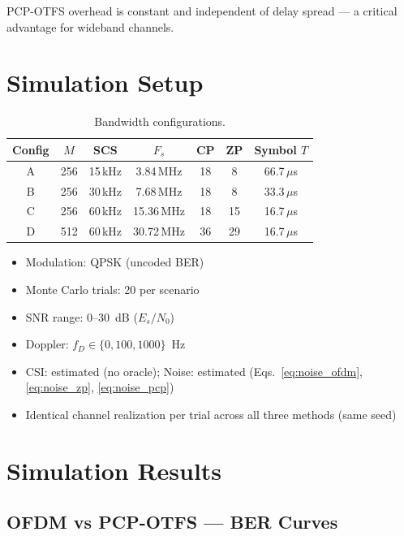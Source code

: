 \documentclass[11pt,a4paper,twoside]{article}
\begin{document}
PCP-OTFS overhead is constant and independent of delay spread --- a critical advantage for wideband channels.

\section{Simulation Setup}
\label{sec:sim}

\begin{table}[h]
\centering
\caption{Bandwidth configurations.}
\label{tab:configs}
\begin{tabular}{ccccccc}
\toprule
Config & $M$ & SCS & $F_s$ & CP & ZP & Symbol $T$ \\
\midrule
A & 256 & 15\,kHz & 3.84\,MHz & 18 & 8 & 66.7\,$\mu$s \\
B & 256 & 30\,kHz & 7.68\,MHz & 18 & 8 & 33.3\,$\mu$s \\
C & 256 & 60\,kHz & 15.36\,MHz & 18 & 15 & 16.7\,$\mu$s \\
D & 512 & 60\,kHz & 30.72\,MHz & 36 & 29 & 16.7\,$\mu$s \\
\bottomrule
\end{tabular}
\end{table}

\begin{itemize}[nosep]
    \item Modulation: QPSK (uncoded BER)
    \item Monte Carlo trials: 20 per scenario
    \item SNR range: 0--30~dB ($E_s/N_0$)
    \item Doppler: $f_D \in \{0, 100, 1000\}$~Hz
    \item CSI: estimated (no oracle); Noise: estimated (Eqs.~\ref{eq:noise_ofdm}, \ref{eq:noise_zp}, \ref{eq:noise_pcp})
    \item Identical channel realization per trial across all three methods (same seed)
\end{itemize}

\section{Simulation Results}
\label{sec:results}

\subsection{OFDM vs PCP-OTFS --- BER Curves}
\end{document}

